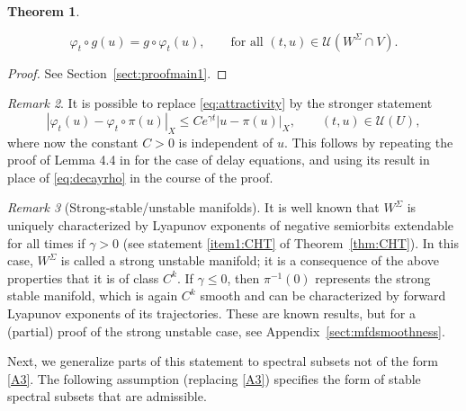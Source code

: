 \documentclass[a4paper, 12pt, oneside, reqno, notitlepage]{amsart}
\theoremstyle{plain}
\newtheorem{theorem}{Theorem}
\theoremstyle{definition}
\theoremstyle{remark}
\newtheorem{remark}[theorem]{Remark}
\begin{document}
\begin{theorem}
\begin{enumerate}[label=\upshape{(\roman*)}]
        \begin{displaymath}
            \varphi_t \circ g(u) = g\circ \varphi_t (u), \qquad \text{for all }  (t,u) \in \mathcal{U}(W^\Sigma \cap V ).
        \end{displaymath}
    \end{enumerate}
\end{theorem}

\begin{proof}
    See Section~\ref{sect:proofmain1}.
\end{proof}

\begin{remark}
    It is possible to replace \eqref{eq:attractivity} by the stronger statement
    \begin{displaymath}
        | \varphi_t(u) - \varphi_t \circ \pi (u)|_X \leq C e^{ \gamma t} |u-\pi(u)|_X, \qquad (t,u) \in \mathcal{U}(U),
    \end{displaymath}
    where now the constant $C>0$ is independent of $u$. 
    This follows by repeating the proof of Lemma 4.4 in \cite{buza2024spectral} for the case of delay equations, and using its result in place of \eqref{eq:decayrho} in the course of the proof.
\end{remark}


\begin{remark}[Strong-stable/unstable manifolds] \label{remark:strongmfds}
    It is well known that  $W^\Sigma$ is uniquely characterized by  Lyapunov exponents of negative semiorbits extendable for all times if $\gamma > 0$ (see statement \ref{item1:CHT} of Theorem~\ref{thm:CHT}). 
    In this case, $W^\Sigma$ is called a strong unstable manifold; it is a consequence of the above properties that it is of class $C^k$.
    If $\gamma \leq 0$, then $\pi^{-1}(0)$ represents the strong stable manifold, which is again $C^k$ smooth and can be characterized by forward Lyapunov exponents of its trajectories.
    These are known results, but for a (partial) proof of the strong unstable case, see Appendix~\ref{sect:mfdsmoothness}.
\end{remark}



Next, we  generalize  parts of this statement to spectral subsets not of the form \ref{A3}.
The following assumption (replacing \ref{A3}) specifies the form of stable spectral subsets that are admissible.
\end{document}
